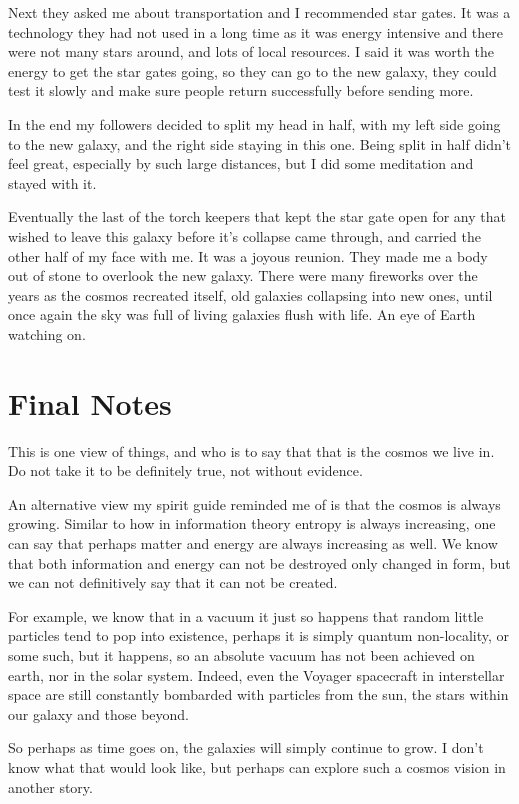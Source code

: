 Next they asked me about transportation and I recommended star gates. It was a
technology they had not used in a long time as it was energy intensive and there
were not many stars around, and lots of local resources. I said it was worth the
energy to get the star gates going, so they can go to the new galaxy, they could
test it slowly and make sure people return successfully before sending more. 

In the end my followers decided to split my head in half, with my left side
going to the new galaxy, and the right side staying in this one. Being split in
half didn't feel great, especially by such large distances, but I did some
meditation and stayed with it. 

Eventually the last of the torch keepers that kept the star gate open for any
that wished to leave this galaxy before it's collapse came through, and carried
the other half of my face with me. It was a joyous reunion. They made me a body
out of stone to overlook the new galaxy. There were many fireworks over the
years as the cosmos recreated itself, old galaxies collapsing into new ones,
until once again the sky was full of living galaxies flush with life. An eye of
Earth watching on. 

\section{Final Notes}

This is one view of things, and who is to say that that is the cosmos we live
in. Do not take it to be definitely true, not without evidence. 

An alternative view my spirit guide reminded me of is that the cosmos is always
growing.  Similar to how in information theory entropy is always increasing, one
can say that perhaps matter and energy are always increasing as well.  We know that
both information and energy can not be destroyed only changed in form, but we
can not definitively say that it can not be created. 

For example, we know that in a vacuum it just so happens that random little
particles tend to pop into existence, perhaps it is simply quantum
non-locality, or some such, but it happens, so an absolute vacuum has not been
achieved on earth, nor in the solar system. Indeed, even the Voyager spacecraft
in interstellar space are still constantly bombarded with particles from the
sun, the stars within our galaxy and those beyond. 

So perhaps as time goes on, the galaxies will simply continue to grow. I don't
know what that would look like, but perhaps can explore such a cosmos vision in
another story. 
